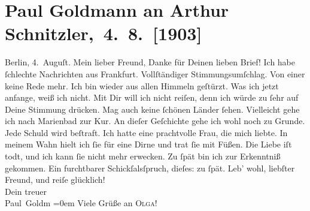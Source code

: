 

         
         \renewcommand{\erwaehntePersonen}{Personen: Theodore Rottenberg, Olga Schnitzler}
         \renewcommand{\erwaehnteOrte}{Orte: Berlin, Frankfurt am Main, Marienbad, Wien}
         \renewcommand{\erwaehnteWerke}{}
               \section[ Paul Goldmann an Arthur Schnitzler, 4. 8. {[}1903{]}]{ Paul Goldmann an Arthur Schnitzler, 4. 8. {[}1903{]}}\nopagebreak{}\rehead{ }\begin{ledgroupsized}[t]{13cm}\normalsize\beginnumbering \toendnotes[C]{\smallbreak\pagebreak[2]} 
\toendnotes[C]{\smallbreak}\pstart
           \centering{}{\pb}Berlin, 4. Auguſt.\pend
           \pstart{}Mein lieber Freund,\pend\pstart
           Danke für Deinen lieben Brief!\pend
           \pstart
           Ich habe ſchlechte Nachrichten aus Frankfurt.
               Vollſtändiger Stimmungsumſchlag. Von einer \label{K_L03380-1v}\label{K_L03380-1h} keine Rede mehr.\pend
           \pstart
           Ich bin wieder aus allen Himmeln geſtürzt. Was ich jetzt anfange, weiß ich nicht. Mit
               Dir will ich nicht reiſen, denn ich würde zu ſehr auf Deine Stimmung drücken. Mag
               auch keine ſchönen Länder ſehen. Vielleicht gehe ich nach Marienbad zur Kur.\pend
           \pstart
           An dieſer Geſchichte gehe ich wohl noch zu Grunde. Jede Schuld wird beſtraft. Ich
               hatte eine prachtvolle Frau,
               die {\pb}mich liebte. In meinem Wahn hielt ich ſie für eine Dirne und trat
               ſie mit Füßen. Die Liebe iſt todt, und ich kann ſie nicht mehr erwecken. Zu ſpät bin
               ich zur Erkenntniß gekommen. Ein furchtbarer Schickſalsſpruch, dieſes: zu ſpät.\pend
           \pstart
           Leb’ wohl, liebſter Freund, und reiſe glücklich! {\\[\baselineskip]}Dein treuer {\\[\baselineskip]}\spacefill\mbox{Paul Goldm}\pend
           \leftskip=0em{}\pstart
           \noindent{}Viele Grüße an \textsc{Olga}!\pend
           

\end{ledgroupsized}
